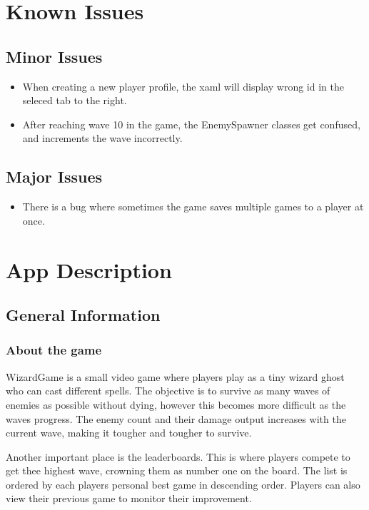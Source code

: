 \documentclass[12pt]{article}
\begin{document}
\section{Known Issues}

    \subsection{Minor Issues}

    \begin{itemize}
        \item When creating a new player profile, the xaml will display wrong id in the seleced tab to the right.
        \item After reaching wave 10 in the game, the EnemySpawner classes get confused, and increments the wave incorrectly.
    \end{itemize}

    \subsection{Major Issues}

    \begin{itemize}
        \item There is a bug where sometimes the game saves multiple games to a player at once.
    \end{itemize}

\section{App Description}

    \subsection{General Information}

        \subsubsection{About the game}

        WizardGame is a small video game where players play as a tiny wizard ghost who can cast different spells. The objective is to survive as many waves of enemies as possible without dying, however this becomes more difficult as the waves progress. The enemy count and their damage output increases with the current wave, making it tougher and tougher to survive. 
        
        Another important place is the leaderboards. This is where players compete to get thee highest wave, crowning them as number one on the board. The list is ordered by each players personal best game in descending order. Players can also view their previous game to monitor their improvement.
\end{document}
